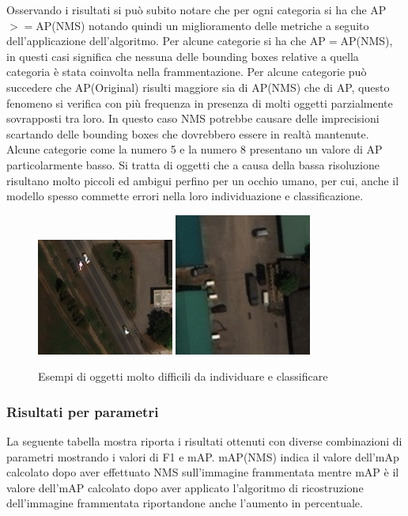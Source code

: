 Osservando i risultati si può subito notare che per ogni categoria si ha che AP$>=$AP(NMS) notando quindi un miglioramento delle metriche a seguito dell'applicazione dell'algoritmo. Per alcune categorie si ha che AP$=$AP(NMS), in questi casi significa che nessuna delle bounding boxes relative a quella categoria è stata coinvolta nella frammentazione. Per alcune categorie può succedere che AP(Original) risulti maggiore sia di AP(NMS) che di AP, questo fenomeno si verifica con più frequenza in presenza di molti oggetti parzialmente sovrapposti tra loro. In questo caso NMS potrebbe causare delle imprecisioni scartando delle bounding boxes che dovrebbero essere in realtà mantenute. Alcune categorie come la numero 5 e la numero 8 presentano un valore di AP particolarmente basso. Si tratta di oggetti che a causa della bassa risoluzione risultano molto piccoli ed ambigui perfino per un occhio umano, per cui, anche il modello spesso commette errori nella loro individuazione e classificazione.
\begin{figure}
\begin{center}
\includegraphics[width=0.4\textwidth, height=0.25\textheight]{images/auto1-satellite.jpg}
\includegraphics[width=0.4\textwidth, height=0.25\textheight]{images/auto2-satellite.jpg}
\end{center}
\caption{Esempi di oggetti molto difficili da individuare e classificare}
\end{figure}

\clearpage
\subsubsection{Risultati per parametri}
La seguente tabella mostra riporta i risultati ottenuti con diverse combinazioni di parametri mostrando i valori di F1 e mAP. mAP(NMS) indica il valore dell'mAp calcolato dopo aver effettuato NMS sull'immagine frammentata mentre mAP è il valore dell'mAP calcolato dopo aver applicato l'algoritmo di ricostruzione dell'immagine frammentata riportandone anche l'aumento in percentuale.

